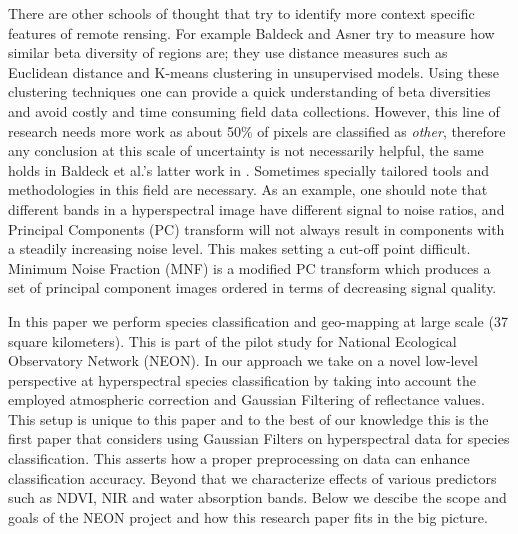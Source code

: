 \documentclass[remotesensing,article,accept,moreauthors,pdftex,12pt,a4paper]{mdpi}
\begin{document}
There are other schools of thought that try to identify more context specific features of remote rensing. 
For example Baldeck and Asner \cite{baldeck2013estimating} try to measure how similar beta diversity of regions are; 
they use distance measures such as Euclidean distance and K-means clustering in unsupervised models. 
Using these clustering techniques one can provide a quick understanding of beta diversities and avoid costly and time consuming field data collections. 
However, this line of research needs more work as about 50\% of pixels are classified as \textit{other}, therefore any conclusion at this scale of uncertainty is not necessarily helpful, the same holds in Baldeck et al.'s latter work in \cite{baldeck2014landscape}.
 Sometimes specially tailored tools and methodologies in this field are necessary. 
 As an example, one should note that different bands in a hyperspectral image have different signal to noise ratios, and Principal Components (PC) transform will not always result in components with a steadily increasing noise level. 
 This makes setting a cut-off point difficult. 
 Minimum Noise Fraction (MNF)   \cite{green1988transformation} is a modified PC transform which produces a set of principal component images ordered in terms of decreasing signal quality. 

In this paper we perform species classification and geo-mapping at large scale (37 square kilometers). 
This is part of the pilot study for National Ecological Observatory Network (NEON). 
In our approach we take on a novel low-level perspective at hyperspectral species classification by taking into account the employed atmospheric correction and Gaussian Filtering of reflectance values. 
This setup is unique to this paper and to the best of our knowledge this is the first paper that considers using Gaussian Filters on hyperspectral data for species classification. 
This asserts how a proper preprocessing on data can enhance classification accuracy.
 Beyond that we characterize effects of various predictors such as NDVI, NIR and water absorption bands.
  Below we descibe the scope and goals of the NEON project and how this research paper fits in the big picture.


\end{document}

